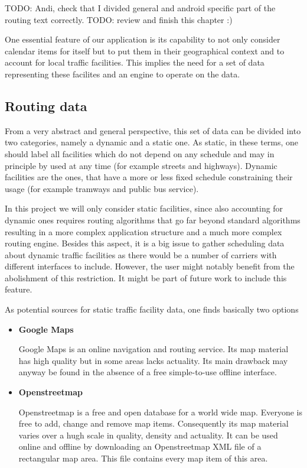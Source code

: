 TODO: Andi, check that I divided general and android specific part of the routing text correctly.
TODO: review and finish this chapter :) 

One essential feature of our application is its capability to not only consider calendar items for itself but to put them in their geographical context and to account for local traffic facilities. This implies the need for a set of data representing these facilites and an engine to operate on the data.\newline

\subsection{Routing data}

From a very abstract and general perspective, this set of data can be divided into two categories, namely a dynamic and a static one. As static, in these terms, one should label all facilities which do not depend on any schedule and may in principle by used at any time (for example streets and highways). Dynamic facilities are the ones, that have a more or less fixed schedule constraining their usage (for example tramways and public bus service).\newline

In this project we will only consider static facilities, since also accounting for dynamic ones requires routing algorithms that go far beyond standard algorithms resulting in a more complex application structure and a much more complex routing engine. Besides this aspect, it is a big issue to gather scheduling data about dynamic traffic facilities as there would be a number of carriers with different interfaces to include. However, the user might notably benefit from the abolishment of this restriction. It might be part of future work to include this feature.\newline
 
As potential sources for static traffic facility data, one finds basically two options

\begin{itemize}
 
	\item \textbf{Google Maps}
	
		Google Maps is an online navigation and routing service. Its map material has high quality but in some areas lacks actuality. Its main drawback may anyway be found in the absence of a free simple-to-use offline interface. 
	
	\item \textbf{Openstreetmap}
	
		Openstreetmap is a free and open database for a world wide map. Everyone is free to add, change and remove map items. Consequently its map material varies over a hugh scale in quality, density and actuality. It can be used online and offline by downloading an Openstreetmap XML file of a rectangular map area. This file contains every map item of this area.
  
\end{itemize} 

